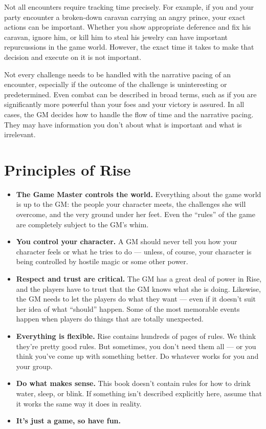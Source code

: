     Not all encounters require tracking time precisely.
    For example, if you and your party encounter a broken-down caravan carrying an angry prince, your exact actions can be important.
    Whether you show appropriate deference and fix his caravan, ignore him, or kill him to steal his jewelry can have important repurcussions in the game world.
    However, the exact time it takes to make that decision and execute on it is not important.

    Not every challenge needs to be handled with the narrative pacing of an encounter, especially if the outcome of the challenge is uninteresting or predetermined.
    Even combat can be described in broad terms, such as if you are significantly more powerful than your foes and your victory is assured.
    In all cases, the GM decides how to handle the flow of time and the narrative pacing.
    They may have information you don't about what is important and what is irrelevant.

\section{Principles of Rise}

    \begin{itemize}
        \item \textbf{The Game Master controls the world.} Everything about the game world is up to the GM\@: the people your character meets, the challenges she will overcome, and the very ground under her feet.
            Even the ``rules'' of the game are completely subject to the GM's whim.
        \item \textbf{You control your character.} A GM should never tell you how your character feels or what he tries to do --- unless, of course, your character is being controlled by hostile magic or some other power.
        \item \textbf{Respect and trust are critical.} The GM has a great deal of power in Rise, and the players have to trust that the GM knows what she is doing.
            Likewise, the GM needs to let the players do what they want --- even if it doesn't suit her idea of what ``should'' happen.
            Some of the most memorable events happen when players do things that are totally unexpected.
        \item \textbf{Everything is flexible.} Rise contains hundreds of pages of rules.
            We think they're pretty good rules.
            But sometimes, you don't need them all --- or you think you've come up with something better.
            Do whatever works for you and your group.
        \item \textbf{Do what makes sense.} This book doesn't contain rules for how to drink water, sleep, or blink.
            If something isn't described explicitly here, assume that it works the same way it does in reality.
        \item \textbf{It's just a game, so have fun.}
    \end{itemize}


